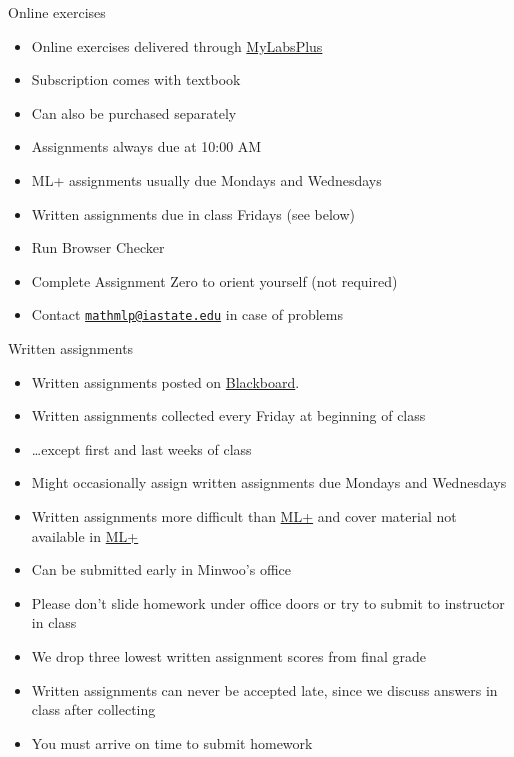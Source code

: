 \documentclass[xcolor=dvipsnames]{beamer}
\theoremstyle{definition}
\begin{document}
\begin{frame}{Online exercises}
\begin{itemize}
\item Online exercises delivered through
\href{http://iastate.mylabsplus.com}{\color{blue} MyLabsPlus}
\item Subscription comes with textbook
\item Can also be purchased separately
\item Assignments always due at 10:00 AM
\item ML+ assignments usually due Mondays and Wednesdays
\item Written assignments due in class Fridays (see below)
\item Run Browser Checker
\item Complete Assignment Zero to orient yourself (not required)
\item Contact
\href{mailto://mathmlp@iastate.edu}{\color{blue}\tt mathmlp@iastate.edu}
in case of problems
\end{itemize}
\end{frame}

\begin{frame}{Written assignments}
\begin{itemize}
\item Written assignments posted on
\href{https://bb.its.iastate.edu}{\color{blue} Blackboard}.
\item Written assignments collected \alert{every Friday}
at \alert{beginning} of class
\item \dots except first and last weeks of class
\item Might occasionally assign written assignments
due Mondays and Wednesdays
\item Written assignments more difficult than 
\href{http://iastate.mylabsplus.com}{\color{blue}ML+}
and cover material not available in
\href{http://iastate.mylabsplus.com}{\color{blue}ML+}
\item Can be submitted early in Minwoo's office
\item Please don't slide homework under office doors or try to
submit to instructor in class
\item We drop three lowest written assignment scores from final grade
\item Written assignments can \alert{never} be accepted late,
since we discuss answers in class after collecting
\item You must arrive on time to submit homework
\end{itemize}
\end{frame}
\end{document}

